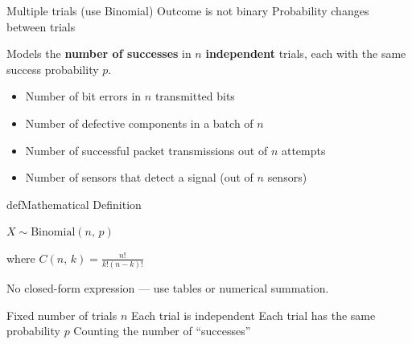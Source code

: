 
\PSno{} Multiple trials (use Binomial)\PSbr{}\PSno{} Outcome is not binary\PSbr{}\PSno{} Probability changes between trials



Models the \textbf{number of successes} in $n$ \textbf{independent} trials, each with the same success probability $p$.


\begin{itemize}
\tightlist
\item
  Number of bit errors in $n$ transmitted bits
\item
  Number of defective components in a batch of $n$
\item
  Number of successful packet transmissions out of $n$ attempts
\item
  Number of sensors that detect a signal (out of $n$ sensors)
\end{itemize}

\begin{PSbox}[unbreakable]{def}{Mathematical Definition}

$X \sim \mathrm{Binomial}(n,\, p)$

\end{PSbox}



where $C(n,\,k) = \frac{n!}{k!(n-k)!}$



No closed-form expression — use tables or numerical summation.






\PSyes{} Fixed number of trials $n$\PSbr{}\PSyes{} Each trial is independent\PSbr{}\PSyes{} Each trial has the same probability $p$\PSbr{}\PSyes{} Counting the number of ``successes''

